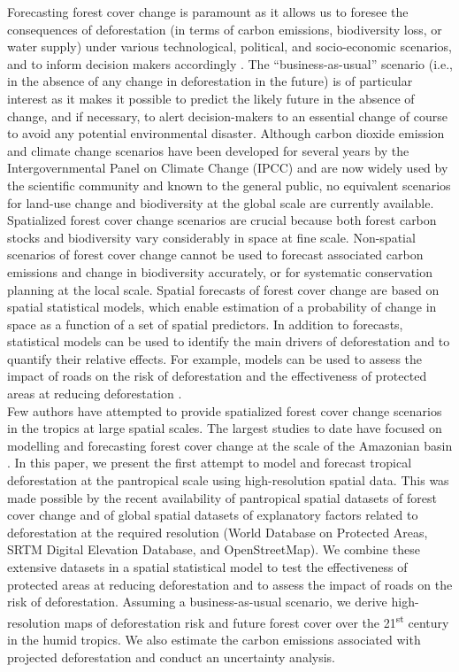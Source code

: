 \documentclass[
  12pt,
]{article}
\begin{document}
Forecasting forest cover change is paramount as it allows us to foresee the consequences of deforestation (in terms of carbon emissions, biodiversity loss, or water supply) under various technological, political, and socio-economic scenarios, and to inform decision makers accordingly \citep{Clark2001}. The ``business-as-usual'' scenario (i.e., in the absence of any change in deforestation in the future) is of particular interest as it makes it possible to predict the likely future in the absence of change, and if necessary, to alert decision-makers to an essential change of course to avoid any potential environmental disaster. Although carbon dioxide emission and climate change scenarios have been developed for several years \citep{IPCC2014} by the Intergovernmental Panel on Climate Change (IPCC) and are now widely used by the scientific community and known to the general public, no equivalent scenarios for land-use change and biodiversity at the global scale are currently available. Spatialized forest cover change scenarios are crucial because both forest carbon stocks \citep{Baccini2017, Avitabile2016} and biodiversity \citep{Kremen2008, Mittermeier2011} vary considerably in space at fine scale. Non-spatial scenarios of forest cover change \citep{FAO2015} cannot be used to forecast associated carbon emissions and change in biodiversity accurately, or for systematic conservation planning at the local scale. Spatial forecasts of forest cover change are based on spatial statistical models, which enable estimation of a probability of change in space as a function of a set of spatial predictors. In addition to forecasts, statistical models can be used to identify the main drivers of deforestation and to quantify their relative effects. For example, models can be used to assess the impact of roads on the risk of deforestation \citep{Laurance2014} and the effectiveness of protected areas at reducing deforestation \citep{Andam2008, Wolf2021}.\\

Few authors have attempted to provide spatialized forest cover change scenarios in the tropics at large spatial scales. The largest studies to date have focused on modelling and forecasting forest cover change at the scale of the Amazonian basin \citep{Soares-Filho2006}. In this paper, we present the first attempt to model and forecast tropical deforestation at the pantropical scale using high-resolution spatial data. This was made possible by the recent availability of pantropical spatial datasets of forest cover change \citep{Vancutsem2021} and of global spatial datasets of explanatory factors related to deforestation at the required resolution (World Database on Protected Areas, SRTM Digital Elevation Database, and OpenStreetMap). We combine these extensive datasets in a spatial statistical model to test the effectiveness of protected areas at reducing deforestation and to assess the impact of roads on the risk of deforestation. Assuming a business-as-usual scenario, we derive high-resolution maps of deforestation risk and future forest cover over the 21\textsuperscript{st} century in the humid tropics. We also estimate the carbon emissions associated with projected deforestation and conduct an uncertainty analysis.
\end{document}
